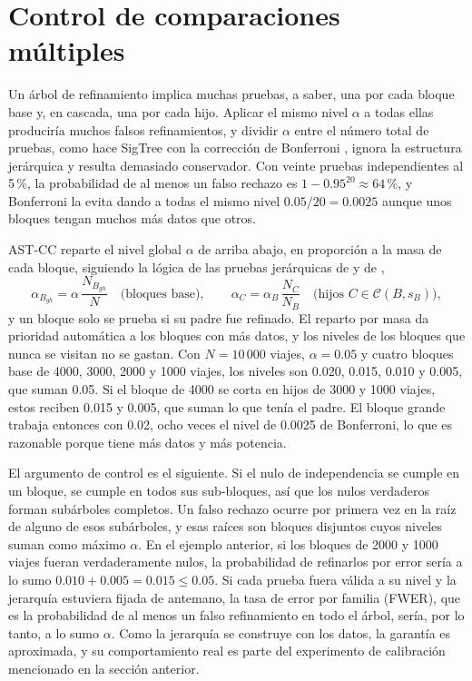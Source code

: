 \section{Control de comparaciones múltiples}\label{sec:prop-multiplicidad}

Un árbol de refinamiento implica muchas pruebas, a saber, una por cada bloque base
y, en cascada, una por cada hijo. Aplicar el mismo nivel $\alpha$ a todas ellas
produciría muchos falsos refinamientos, y dividir $\alpha$ entre el número total
de pruebas, como hace SigTree con la corrección de Bonferroni \cite{Hu2025},
ignora la estructura jerárquica y resulta demasiado conservador. Con veinte
pruebas independientes al 5\,\%, la probabilidad de al menos un falso rechazo es
$1-0.95^{20}\approx 64$\,\%, y Bonferroni la evita dando a todas el mismo nivel
$0.05/20 = 0.0025$ aunque unos bloques tengan muchos más datos que otros.

AST-CC reparte el nivel global $\alpha$ de arriba abajo, en proporción a la masa
de cada bloque, siguiendo la lógica de las pruebas jerárquicas de
\cite{Meinshausen2008} y de \cite{Kimes2017},
\begin{equation}\label{eq:prop-alpha}
  \alpha_{B_{gh}} = \alpha\,\frac{N_{B_{gh}}}{N}\quad\text{(bloques base)},
  \qquad
  \alpha_{C} = \alpha_B\,\frac{N_C}{N_B}\quad\text{(hijos } C\in\mathcal{C}(B,s_B)\text{)},
\end{equation}
y un bloque solo se prueba si su padre fue refinado. El reparto por masa da
prioridad automática a los bloques con más datos, y los niveles de los bloques
que nunca se visitan no se gastan. Con $N=10\,000$ viajes, $\alpha=0.05$ y cuatro
bloques base de 4000, 3000, 2000 y 1000 viajes, los niveles son 0.020, 0.015, 0.010
y 0.005, que suman 0.05. Si el bloque de 4000 se corta en hijos de 3000 y 1000
viajes, estos reciben 0.015 y 0.005, que suman lo que tenía el padre. El bloque
grande trabaja entonces con 0.02, ocho veces el nivel de 0.0025 de Bonferroni, lo
que es razonable porque tiene más datos y más potencia.

El argumento de control es el siguiente. Si el nulo de independencia se cumple
en un bloque, se cumple en todos sus sub-bloques, así que los nulos verdaderos
forman subárboles completos. Un falso rechazo ocurre por primera vez en la raíz
de alguno de esos subárboles, y esas raíces son bloques disjuntos cuyos niveles
suman como máximo $\alpha$. En el ejemplo anterior, si los bloques de 2000 y 1000
viajes fueran verdaderamente nulos, la probabilidad de refinarlos por error sería a
lo sumo $0.010+0.005=0.015\le 0.05$. Si cada prueba fuera válida a su nivel y la
jerarquía estuviera fijada de antemano, la tasa de error por familia (FWER), que es
la probabilidad de al menos un falso refinamiento en todo el árbol, sería, por lo
tanto, a lo sumo $\alpha$. Como la jerarquía se construye con los
datos, la garantía es aproximada, y su comportamiento real es parte del
experimento de calibración mencionado en la sección anterior.

